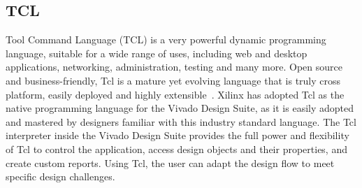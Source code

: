 \subsection{TCL}\label{tcl}
Tool Command Language (TCL) is a very powerful dynamic programming language, suitable for a wide range of uses, including web and desktop applications, networking, administration, testing and many more. Open source and business-friendly, Tcl is a mature yet evolving language that is truly cross platform, easily deployed and highly extensible~\cite{tcl}.
Xilinx has adopted Tcl as the native programming language for the Vivado Design Suite,
as it is easily adopted and mastered by designers familiar with this industry standard
language. The Tcl interpreter inside the Vivado Design Suite provides the full power and
flexibility of Tcl to control the application, access design objects and their properties, and
create custom reports. Using Tcl, the user can adapt the design flow to meet specific design
challenges.

